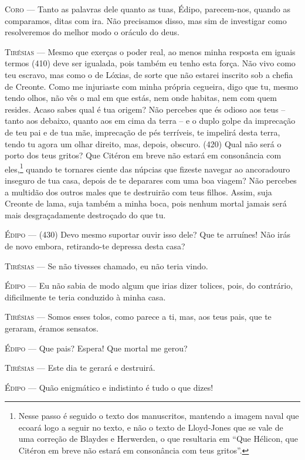 \textsc{Coro} --- Tanto as palavras dele quanto as tuas, Édipo, parecem-nos, quando as
comparamos, ditas com ira. Não precisamos disso, mas sim de investigar
como resolveremos do melhor modo o oráculo do deus.

\textsc{Tirésias} --- Mesmo que exerças o poder real, ao menos minha resposta em iguais termos
(410) deve ser igualada, pois também eu tenho esta força. Não vivo como
teu escravo, mas como o de Lóxias, de sorte que não estarei inscrito sob
a chefia de Creonte. Como me injuriaste com minha própria cegueira, digo
que tu, mesmo tendo olhos, não vês o mal em que estás, nem onde habitas,
nem com quem resides. Acaso sabes qual é tua origem? Não percebes que és
odioso aos teus -- tanto aos debaixo, quanto aos em cima da terra -- e o
duplo golpe da imprecação de teu pai e de tua mãe, imprecação de pés
terríveis, te impelirá desta terra, tendo tu agora um olhar direito,
mas, depois, obscuro. (420) Qual não será o porto dos teus gritos? Que
Citéron em breve não estará em consonância com eles,\footnote{Nesse passo
  é seguido o texto dos manuscritos, mantendo a imagem naval que ecoará
  logo a seguir no texto, e não o texto de Lloyd-Jones que se vale de
  uma correção de Blaydes e Herwerden, o que resultaria em ``Que
  Hélicon, que Citéron em breve não estará em consonância com teus
  gritos''.} quando te tornares ciente das núpcias que fizeste navegar
ao ancoradouro inseguro de tua casa, depois de te deparares com uma boa
viagem? Não percebes a multidão dos outros males que te destruirão com
teus filhos. Assim, suja Creonte de lama, suja também a minha boca, pois
nenhum mortal jamais será mais desgraçadamente destroçado do que tu.

\textsc{Édipo} --- (430) Devo mesmo suportar ouvir isso dele? Que te arruínes! Não irás de
novo embora, retirando-te depressa desta casa?

\textsc{Tirésias} --- Se não tivesses chamado, eu não teria vindo.

\textsc{Édipo} --- Eu não sabia de modo algum que irias dizer tolices, pois, do contrário,
dificilmente te teria conduzido à minha casa.

\textsc{Tirésias} --- Somos esses tolos, como parece a ti, mas, aos teus pais, que te geraram,
éramos sensatos.

\textsc{Édipo} --- Que pais? Espera! Que mortal me gerou?

\textsc{Tirésias} --- Este dia te gerará e destruirá.

\textsc{Édipo} --- Quão enigmático e indistinto é tudo o que dizes!

